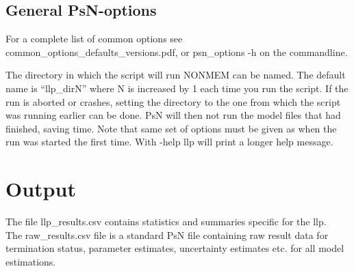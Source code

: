 \subsection{General PsN-options}

For a complete list of common options see common\_options\_defaults\_versions.pdf, or psn\_options -h on the commandline.

\begin{optionlist}
The directory in which the script will run NONMEM can be named. The default name is “llp\_dirN” where N is increased by 1 each time you run the script. If the run is aborted or crashes, setting the directory to the one from which the script was running earlier can be done. PsN will then not run the model files that had finished, saving time. Note that same set of options must be given as when the run was started the first time. 
\nextopt
{}
With -help llp will print a longer help message. 
\nextopt
\end{optionlist}


\section{Output}

The file llp\_results.csv contains statistics and summaries specific for the llp. \\
The raw\_results.csv file is a standard PsN file containing raw result data for termination status, parameter estimates, uncertainty estimates etc. for all model estimations. 



